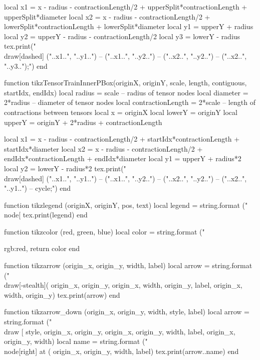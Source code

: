 \begin{luacode*}
	 local x1 = x - radius - contractionLength/2 + upperSplit*contractionLength + upperSplit*diameter
	 local x2 = x - radius - contractionLength/2 + lowerSplit*contractionLength + lowerSplit*diameter
	 local y1 = upperY + radius
	 local y2 = upperY - radius - contractionLength/2
	 local y3 = lowerY - radius
	 tex.print("\\draw[dashed] ("..x1..", "..y1..") -- ("..x1..", "..y2..") -- ("..x2..", "..y2..") -- ("..x2..", "..y3..");")
end

function tikzTensorTrainInnerPBox(originX, originY, scale, length, contiguous, startIdx, endIdx)
	 local radius = scale              -- radius of tensor nodes
	 local diameter = 2*radius         -- diameter of tensor nodes
	 local contractionLength = 2*scale -- length of contractions between tensors
	 local x = originX
	 local lowerY = originY
	 local upperY = originY + 2*radius + contractionLength

	 local x1 = x - radius - contractionLength/2 + startIdx*contractionLength + startIdx*diameter
	 local x2 = x - radius - contractionLength/2 + endIdx*contractionLength + endIdx*diameter
	 local y1 = upperY + radius*2
	 local y2 = lowerY - radius*2
	 tex.print("\\draw[dashed] ("..x1..", "..y1..") -- ("..x1..", "..y2..") -- ("..x2..", "..y2..") -- ("..x2..", "..y1..") -- cycle;")
end

function tikzlegend (originX, originY, pos, text)
	 local legend = string.format ("\\node[%
	 tex.print(legend)
end

function tikzcolor (red, green, blue)
	 local color = string.format ("{rgb:red,%
	 return color
end

function tikzarrow (origin_x, origin_y, width, label)
	 local arrow = string.format ("\\draw[-stealth](%
																origin_x, origin_y, origin_x, width, origin_y, label, origin_x, width, origin_y)
	 tex.print(arrow)
end

function tikzarrow_down (origin_x, origin_y, width, style, label)
	 local arrow = string.format ("\\draw [%
																style, origin_x, origin_y, origin_x, origin_y, width, label, origin_x, origin_y, width)
	 local name = string.format ("\\node[right] at (%
															 origin_x, origin_y, width, label)
	 tex.print(arrow..name)
end

}
\end{luacode*}
